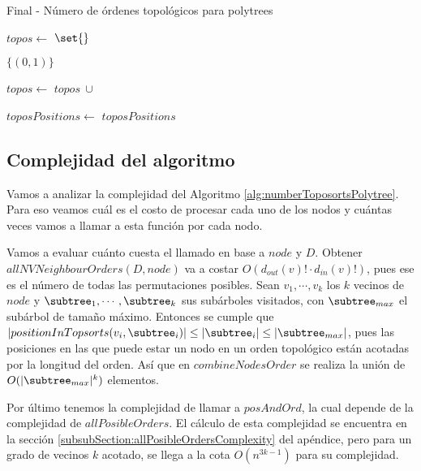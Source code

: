 \begin{algorithm}
\caption{Final - Número de órdenes topológicos para polytrees} \label{alg:numberToposortsPolytree}
\begin{algorithmic}[1]
    \State $topos \gets$ $\set{}$

            \State \Return $\{(0,1)\}$ %
    \EndIf
    
        \State $topos \gets$ $topos \ \cup$ 
    \EndFor

    \State $toposPositions \gets$ 
    \State \Return $toposPositions$
\EndFunction
\end{algorithmic}
\end{algorithm}
 

\subsection{Complejidad del algoritmo}
\label{subSection:polytreeCountingComplexity}

Vamos a analizar la complejidad del Algoritmo \ref{alg:numberToposortsPolytree}. Para eso veamos cuál es el costo de procesar cada uno de los nodos y cuántas veces vamos a llamar a esta función por cada nodo. 

Vamos a evaluar cuánto cuesta el llamado en base a $node$ y $D$. Obtener $allNVNeighbourOrders(D,node)$ va a costar $O(d_{out}(v)! \cdot d_{in}(v)!)$, pues ese es el número de todas las permutaciones posibles. Sean $v_1, \cdots, v_k$ los $k$ vecinos de $node$ y $\subtree_1, \cdots, \subtree_k$ sus subárboles visitados, con $\subtree_{max}$ el subárbol de tamaño máximo. Entonces se cumple que $|positionInTopsorts(v_i, \subtree_i)| \leq |\subtree_i| \leq |\subtree_{max}|$, pues las posiciones en las que puede estar un nodo en un orden topológico están acotadas por la longitud del orden. Así que en $combineNodesOrder$ se realiza la unión de $O(|\subtree_{max}|^k)$ elementos. 

Por último tenemos la complejidad de llamar a $posAndOrd$, la cual depende de la complejidad de $allPosibleOrders$. El cálculo de esta complejidad se encuentra en la sección \ref{subsubSection:allPosibleOrdersComplexity} del apéndice, pero para un grado de vecinos $k$ acotado, se llega a la cota $O(n^{3k-1})$ para su complejidad. 


